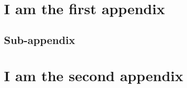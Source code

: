 \appendix
\section{I am the first appendix}
\lipsum[2-3]
\subsection{Sub-appendix}
\lipsum[2-3]

\section{I am the second appendix}
\lipsum[2-3]